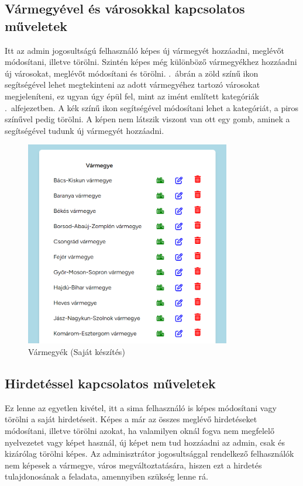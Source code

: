 \documentclass[]{thesis-ekf}
\theoremstyle{definition}
\theoremstyle{remark}
\begin{document}
	\subsection{Vármegyével és városokkal kapcsolatos műveletek}
		Itt az admin jogosultságú felhasználó képes új vármegyét hozzáadni, meglévőt módosítani, illetve törölni. Szintén képes még különböző vármegyékhez hozzáadni új városokat, meglévőt módosítani és törölni. .~ábrán a zöld színű ikon segítségével lehet megtekinteni az adott vármegyéhez tartozó városokat megjeleníteni, ez ugyan úgy épül fel, mint az imént említett kategóriák .~alfejezetben. A kék színű ikon segítségével módosítani lehet a kategóriát, a piros színűvel pedig törölni. A képen nem látszik viszont van ott egy gomb, aminek a segítségével tudunk új vármegyét hozzáadni.
		\begin{figure}[ht!]
			\centering
			\includegraphics[height=9cm]{./felhasznaloi/varmegye}
			\caption{Vármegyék (Saját készítés)} 
			\label{varmegye-varos-muvelet}
		\end{figure}
	\subsection{Hirdetéssel kapcsolatos műveletek}
		Ez lenne az egyetlen kivétel, itt a sima felhasználó is képes módosítani vagy törölni a saját hirdetéseit. Képes a már az összes meglévő hirdetéseket módosítani, illetve törölni azokat, ha valamilyen oknál fogva nem megfelelő nyelvezetet vagy képet használ, új képet nem tud hozzáadni az admin, csak és kizárólag törölni képes. Az adminisztrátor jogosultsággal rendelkező felhasználók nem képesek a vármegye, város megváltoztatására, hiszen ezt a hirdetés tulajdonosának a feladata, amennyiben szükség lenne rá.
\end{document}
